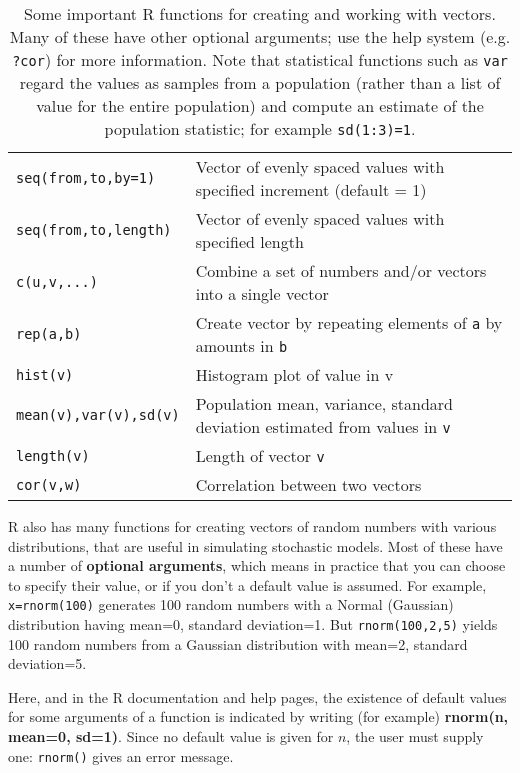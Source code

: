 \documentclass [11pt]{article}
\newcommand{\ttt}[1]{\texttt{#1}}
\numberwithin{exercise}{section}
\def\R{R }
\begin{document}
\begin{table}[b]
\begin{tabular}
{p{110pt}p{320pt}}
\hline 
\hline 
\texttt{seq(from,to,by=1)} & Vector of evenly spaced values with specified increment (default = 1) \\
\ttt{seq(from,to,length)} & Vector of evenly spaced values with specified length \\
\texttt{c(u,v,...) } & Combine a set of numbers and/or vectors into a single vector \\
\texttt{rep(a,b)} & Create vector by repeating elements of \ttt{a} by amounts in \ttt{b} \\
\texttt{hist(v)} & Histogram plot of value in v \\
\texttt{mean(v),var(v),sd(v)} & Population mean, variance, standard deviation estimated from values in \ttt{v} \\
\texttt{length(v)} & Length of vector \texttt{v}  \\
\texttt{cor(v,w)} & Correlation between two vectors \\
\hline
\end{tabular}
\caption{\small{Some important R functions for creating and working with vectors. Many of these have other optional
arguments; use the help system (e.g. \ttt{?cor}) for more information. Note that statistical functions such as
\texttt{var} regard the values as samples from a population (rather than a list of value for the entire
population) and compute an estimate of the population statistic; for example \ttt{sd(1:3)=1}.}}
\label{VectorFunctions}
\end{table}

\R also has many functions for creating vectors of random numbers 
with various distributions, that are useful in simulating stochastic
models. Most of these have a number of \textbf{optional arguments}, 
which means in practice that you can choose to specify their value, or
if you don't a default value is assumed. For example, \ttt{x=rnorm(100)}
generates 100 random numbers with a Normal (Gaussian) distribution having mean=0, standard
deviation=1. But \ttt{rnorm(100,2,5)} 
yields 100 random numbers from a Gaussian distribution with mean=2, standard deviation=5.

Here, and in the \R documentation and help pages, the existence of default values for 
some arguments of a function is indicated 
by writing (for example) \textbf{rnorm(n, mean=0, sd=1)}. Since no default value is given for $n$, 
the user must supply one: \texttt{rnorm()} gives an error message. 
\end{document}

